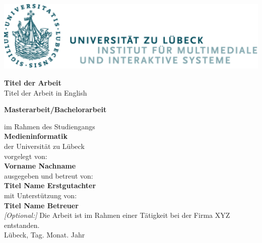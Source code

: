 \begin{titlepage}
    \begin{center}
        \includegraphics{figures/logo.png}\\
        \normalsize
        \sffamily
        
        \vspace{0.5cm} 
        
        \Huge
        \textbf{Titel der Arbeit}\\
        {Titel der Arbeit in English}
        \vfill
        
        \normalsize
        \textbf{Masterarbeit/Bachelorarbeit} \\
        \vspace{0.4cm}
        
        im Rahmen des Studiengangs\\
        \textbf{Medieninformatik}\\
        der Universität zu Lübeck\\

        
        \vspace{0.8cm}
        vorgelegt von: \\
        \large
        \textbf{Vorname Nachname}\\ 
        
        \normalsize
        \vspace{0.8cm}
        ausgegeben und betreut von:\\ 
        \large
        \textbf{Titel Name Erstgutachter}\\
        \vspace{0.3cm}
        \normalsize
        mit Unterstützung von:\> \\ 
        \large
        \textbf{Titel Name Betreuer} \\
        \normalsize
        \vspace{0.5cm}
        \textit{[Optional:]}
        Die Arbeit ist im Rahmen einer Tätigkeit bei der Firma XYZ entstanden.\\
        \vspace{0.3cm}
        Lübeck, Tag. Monat. Jahr\\
    \end{center}
\end{titlepage}